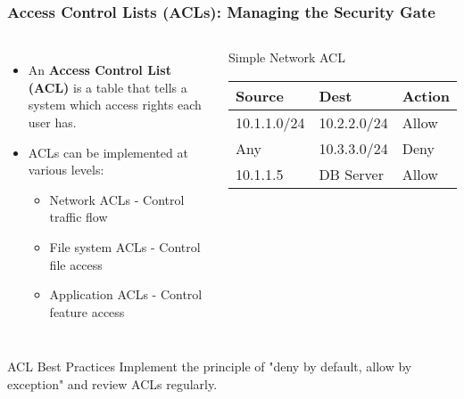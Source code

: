\documentclass{beamer}
\begin{document}
    \begin{frame}
    \frametitle{Access Control Lists (ACLs): Managing the Security Gate}
    
    \begin{columns}[T]
    \begin{itemize}
    \item An \textbf{Access Control List (ACL)} is a table that tells a system which access rights each user has.
    \item ACLs can be implemented at various levels:
        \begin{itemize}
        \item Network ACLs - Control traffic flow
        \item File system ACLs - Control file access
        \item Application ACLs - Control feature access
        \end{itemize}
    \end{itemize}
    
    \begin{exampleblock}{Simple Network ACL}
    \small
    \begin{tabular}{|l|l|l|}
    \hline
    \textbf{Source} & \textbf{Dest} & \textbf{Action} \\
    \hline
    10.1.1.0/24 & 10.2.2.0/24 & Allow \\
    Any & 10.3.3.0/24 & Deny \\
    10.1.1.5 & DB Server & Allow \\
    \hline
    \end{tabular}
    \end{exampleblock}
    \end{columns}
    
    \begin{alertblock}{ACL Best Practices}
    Implement the principle of "deny by default, allow by exception" and review ACLs regularly.
    \end{alertblock}
    \end{frame}
\end{document}
